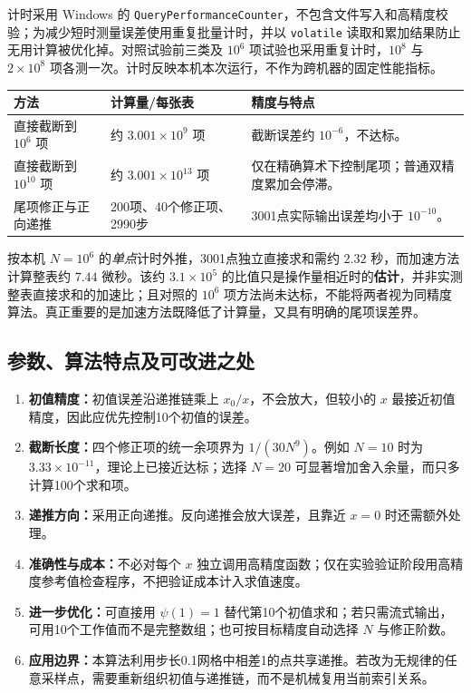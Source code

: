 \documentclass[UTF8,fontset=fandol,zihao=-4,a4paper]{ctexart}
\newcommand{\psif}{\psi}
\begin{document}
计时采用 Windows 的 \texttt{QueryPerformanceCounter}，不包含文件写入和高精度校验；为减少短时测量误差使用重复批量计时，并以 \texttt{volatile} 读取和累加结果防止无用计算被优化掉。对照试验前三类及 $10^6$ 项试验也采用重复计时，$10^8$ 与 $2\times10^8$ 项各测一次。计时反映本机本次运行，不作为跨机器的固定性能指标。

\begin{center}
\begin{tabular}{p{4.1cm}p{4.6cm}p{5.2cm}}
\toprule
方法 & 计算量/每张表 & 精度与特点\\
\midrule
直接截断到 $10^6$ 项 & 约 $3.001\times10^9$ 项 & 截断误差约 $10^{-6}$，不达标。\\
直接截断到 $10^{10}$ 项 & 约 $3.001\times10^{13}$ 项 & 仅在精确算术下控制尾项；普通双精度累加会停滞。\\
尾项修正与正向递推 & 200项、40个修正项、2990步 & 3001点实际输出误差均小于 $10^{-10}$。\\
\bottomrule
\end{tabular}
\end{center}

按本机 $N=10^6$ 的\emph{单点}计时外推，3001点独立直接求和需约 $2.32$ 秒，而加速方法计算整表约 $7.44$ 微秒。该约 $3.1\times10^5$ 的比值只是操作量相近时的\textbf{估计}，并非实测整表直接求和的加速比；且对照的 $10^6$ 项方法尚未达标，不能将两者视为同精度算法。真正重要的是加速方法既降低了计算量，又具有明确的尾项误差界。

\subsection{参数、算法特点及可改进之处}
\begin{enumerate}
 \item \textbf{初值精度：}初值误差沿递推链乘上 $x_0/x$，不会放大，但较小的 $x$ 最接近初值精度，因此应优先控制10个初值的误差。
 \item \textbf{截断长度：}四个修正项的统一余项界为 $1/(30N^9)$。例如 $N=10$ 时为 $3.33\times10^{-11}$，理论上已接近达标；选择 $N=20$ 可显著增加舍入余量，而只多计算100个求和项。
 \item \textbf{递推方向：}采用正向递推。反向递推会放大误差，且靠近 $x=0$ 时还需额外处理。
 \item \textbf{准确性与成本：}不必对每个 $x$ 独立调用高精度函数；仅在实验验证阶段用高精度参考值检查程序，不把验证成本计入求值速度。
 \item \textbf{进一步优化：}可直接用 $\psif(1)=1$ 替代第10个初值求和；若只需流式输出，可用10个工作值而不是完整数组；也可按目标精度自动选择 $N$ 与修正阶数。
 \item \textbf{应用边界：}本算法利用步长0.1网格中相差1的点共享递推。若改为无规律的任意采样点，需要重新组织初值与递推链，而不是机械复用当前索引关系。
\end{enumerate}
\end{document}
